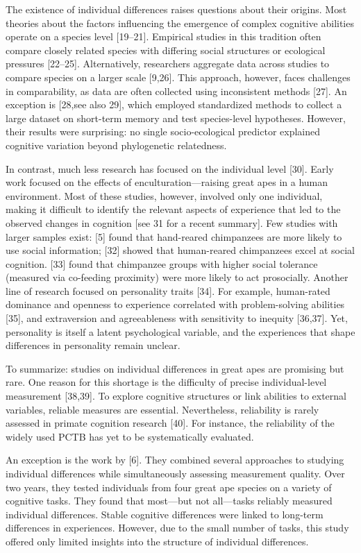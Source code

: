 \documentclass[
  man,floatsintext]{apa6}
\begin{document}
The existence of individual differences raises questions about their origins. Most theories about the factors influencing the emergence of complex cognitive abilities operate on a species level {[}19--21{]}. Empirical studies in this tradition often compare closely related species with differing social structures or ecological pressures {[}22--25{]}. Alternatively, researchers aggregate data across studies to compare species on a larger scale {[}9,26{]}. This approach, however, faces challenges in comparability, as data are often collected using inconsistent methods {[}27{]}. An exception is {[}28,see also 29{]}, which employed standardized methods to collect a large dataset on short-term memory and test species-level hypotheses. However, their results were surprising: no single socio-ecological predictor explained cognitive variation beyond phylogenetic relatedness.

In contrast, much less research has focused on the individual level {[}30{]}. Early work focused on the effects of enculturation---raising great apes in a human environment. Most of these studies, however, involved only one individual, making it difficult to identify the relevant aspects of experience that led to the observed changes in cognition {[}see 31 for a recent summary{]}. Few studies with larger samples exist: {[}5{]} found that hand-reared chimpanzees are more likely to use social information; {[}32{]} showed that human-reared chimpanzees excel at social cognition. {[}33{]} found that chimpanzee groups with higher social tolerance (measured via co-feeding proximity) were more likely to act prosocially. Another line of research focused on personality traits {[}34{]}. For example, human-rated dominance and openness to experience correlated with problem-solving abilities {[}35{]}, and extraversion and agreeableness with sensitivity to inequity {[}36,37{]}. Yet, personality is itself a latent psychological variable, and the experiences that shape differences in personality remain unclear.

To summarize: studies on individual differences in great apes are promising but rare. One reason for this shortage is the difficulty of precise individual-level measurement {[}38,39{]}. To explore cognitive structures or link abilities to external variables, reliable measures are essential. Nevertheless, reliability is rarely assessed in primate cognition research {[}40{]}. For instance, the reliability of the widely used PCTB has yet to be systematically evaluated.

An exception is the work by {[}6{]}. They combined several approaches to studying individual differences while simultaneously assessing measurement quality. Over two years, they tested individuals from four great ape species on a variety of cognitive tasks. They found that most---but not all---tasks reliably measured individual differences. Stable cognitive differences were linked to long-term differences in experiences. However, due to the small number of tasks, this study offered only limited insights into the structure of individual differences.
\end{document}
